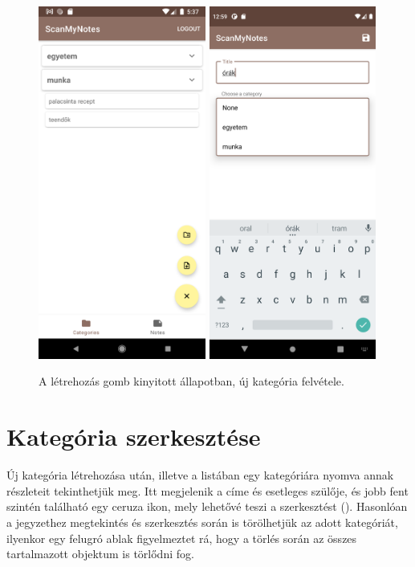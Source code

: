 \begin{figure}[!ht]
	\centering
	\includegraphics[width=55mm, keepaspectratio]{figures/floatingbutton_open.png}
	\includegraphics[width=55mm, keepaspectratio]{figures/category_save.png}
	\caption{A létrehozás gomb kinyitott állapotban, új kategória felvétele.}
	\label{fig:NewCategoryScreen}
\end{figure}
\newpage
\section{Kategória szerkesztése}
Új kategória létrehozása után, illetve a listában egy kategóriára nyomva annak részleteit tekinthetjük meg. Itt megjelenik a címe és esetleges szülője, és jobb fent szintén található egy ceruza ikon, mely lehetővé teszi a szerkesztést (). Hasonlóan a jegyzethez megtekintés és szerkesztés során is törölhetjük az adott kategóriát, ilyenkor egy felugró ablak figyelmeztet rá, hogy a törlés során az összes tartalmazott objektum is törlődni fog.

